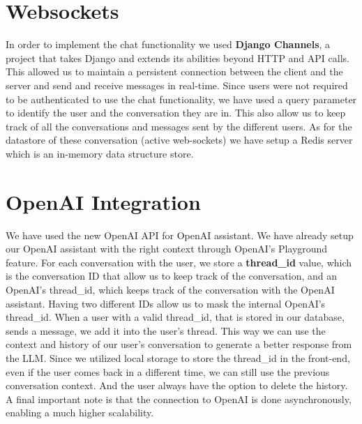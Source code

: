 \section{Websockets}
In order to implement the chat functionality we used \textbf{Django Channels}, a project that takes Django and extends its abilities beyond HTTP and API calls.
This allowed us to maintain a persistent connection between the client and the server and send and receive messages in real-time.
Since users were not required to be authenticated to use the chat functionality, we have used a query parameter to identify the user and the conversation they are in.
This also allow us to keep track of all the conversations and messages sent by the different users.
As for the datastore of these conversation (active web-sockets) we have setup a Redis server which is an in-memory data structure store.

\section{OpenAI Integration}
We have used the new OpenAI API for OpenAI assistant. We have already setup our OpenAI assistant with the right context through OpenAI's Playground feature. For each conversation with the user, we store a \textbf{thread\_id} value, which is the conversation ID that allow us to keep track of the conversation, and an OpenAI's thread\_id, which keeps track of the conversation with the OpenAI assistant. Having two different IDs allow us to mask the internal OpenAI's thread\_id.
When a user with a valid thread\_id, that is stored in our database, sends a message, we add it into the user's thread.
This way we can use the context and history of our user's conversation to generate a better response from the LLM.
Since we utilized local storage to store the thread\_id in the front-end, even if the user comes back in a different time, we can still use the previous conversation context. And the user always have the option to delete the history.
A final important note is that the connection to OpenAI is done asynchronously, enabling a much higher scalability.

